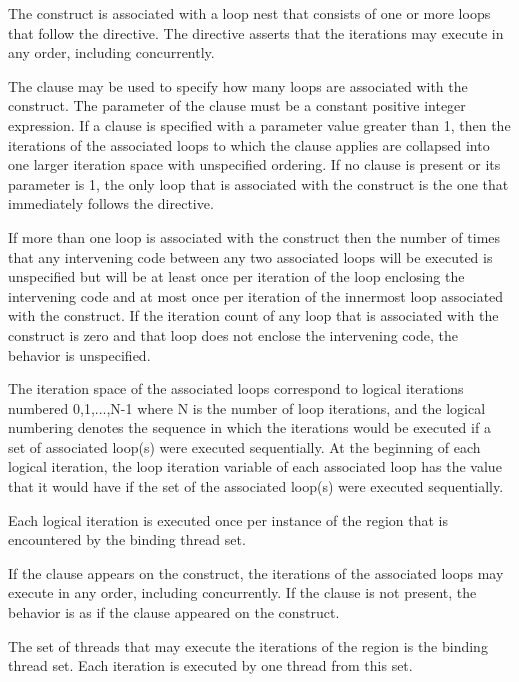\descr
The  construct is associated with a loop nest that consists of one or
more loops that follow the directive. The directive asserts that the iterations
may execute in any order, including concurrently.

The  clause may be used to specify how many loops are associated
with the  construct. The parameter of the  clause
must be a constant positive integer expression. If a  clause is
specified with a parameter value greater than 1, then the iterations of the
associated loops to which the clause applies are collapsed into one larger
iteration space with unspecified ordering. If no  clause is
present or its parameter is 1, the only loop that is associated with the
 construct is the one that immediately follows the 
directive.

If more than one loop is associated with the  construct then the
number of times that any intervening code between any two associated
loops will be executed is unspecified but will be at least once per
iteration of the loop enclosing the intervening code and at most once
per iteration of the innermost loop associated with the construct. If the
iteration count of any loop that is associated with the 
construct is zero and that loop does not
enclose the intervening code, the behavior is unspecified.

The iteration space of the associated loops correspond to logical
iterations numbered 0,1,...,N-1 where N is the number of loop iterations, and
the logical numbering denotes the sequence in which the iterations would be
executed if a set of associated loop(s) were executed sequentially.  At the
beginning of each logical iteration, the loop iteration variable of each
associated loop has the value that it would have if the set of the associated
loop(s) were executed sequentially. 

Each logical iteration is executed once per instance of the 
region that is encountered by the binding thread set.

If the  clause appears on the  construct, the
iterations of the associated loops may execute in any order, including
concurrently. If the  clause is not present, the behavior is as if
the  clause appeared on the construct.

The set of threads that may execute the iterations of the  region is 
the binding thread set. Each iteration is executed by one thread from this set.

